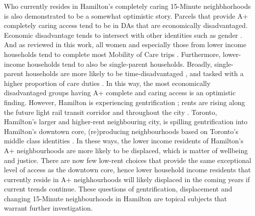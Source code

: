 \documentclass[
  authoryear,
  preprint,
  3p]{elsarticle}
\begin{document}
Who currently resides in Hamilton's completely caring 15-Minute
neighbhorhoods is also demonstrated to be a somewhat optimistic story.
Parcels that provide A+ completely caring access tend to be in DAs that
are economically disadvantaged. Economic disadvantage tends to intersect
with other identities such as gender
\citep{lightmanMeasuringEconomicExclusion2018}. And as reviewed in this
work, all women and especially those from lower income households tend
to complete most Mobility of Care trips
\citep{ravensbergen2023exploratory}. Furthermore, lower-income
households tend to also be single-parent households. Broadly,
single-parent households are more likely to be time-disadvantaged
\citep{nieuwenhuisSingleparentFamiliesWork2018}, and tasked with a
higher proportion of care duties \citep{craigTimeCareComparison2004}. In
this way, the most economically disadvantaged groups having A+ complete
and caring access is an optimistic finding. However, Hamilton is
experiencing gentrification \citep{ellisyoungWeReJust2018}; rents are
rising along the future light rail transit corridor and throughout the
city
\citep{vandermerweSpilloverGentrificationMidsized2021, mayersLightTransitDocumenting2023}.
Toronto, Hamilton's larger and higher-rent neighbouring city, is
spilling gentrification into Hamilton's downtown core, (re)producing
neighbourhoods based on Toronto's middle class identities
\citep{mayersLightTransitDocumenting2023}. In these ways, the lower
income residents of Hamilton's A+ neighbourhoods are more likely to be
displaced, which is matter of wellbeing and justice. There are now few
low-rent choices that provide the same exceptional level of access as
the downtown core, hence lower household income residents that currently
reside in A+ neighhourhoods will likely displaced in the coming years if
current trends continue. These questions of gentrification, displacement
and changing 15-Minute neighbourhoods in Hamilton are topical subjects
that warrant further investigation.
\end{document}
